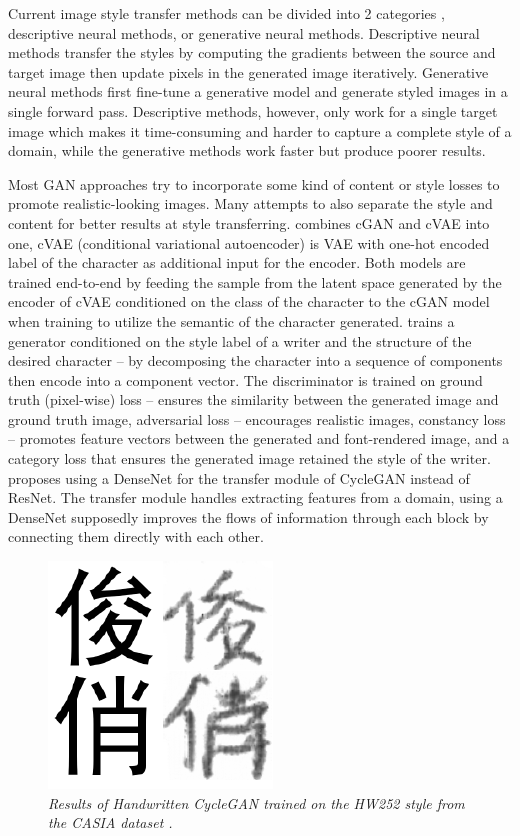 \documentclass[12pt]{report}
\begin{document}
Current image style transfer methods can be divided into 2 categories \cite{neural-style}, descriptive neural methods, or generative neural methods. Descriptive neural methods transfer the styles by computing the gradients between the source and target image then update pixels in the generated image iteratively. Generative neural methods first fine-tune a generative model and generate styled images in a single forward pass. Descriptive methods, however, only work for a single target image which makes it time-consuming and harder to capture a complete style of a domain, while the generative methods work faster but produce poorer results.

Most GAN\cite{gan} approaches try to incorporate some kind of content or style losses to promote realistic-looking images. Many attempts to also separate the style and content for better results at style transferring. \cite{handwritten-cgan} combines cGAN \cite{cgan} and cVAE \cite{cvae} into one, cVAE (conditional variational autoencoder) is VAE with one-hot encoded label of the character as additional input for the encoder. Both models are trained end-to-end by feeding the sample from the latent space generated by the encoder of cVAE conditioned on the class of the character to the cGAN model when training to utilize the semantic of the character generated.
\cite{calligan} trains a generator conditioned on the style label of a writer and the structure of the desired character – by decomposing the character into a sequence of components then encode into a component vector. The discriminator is trained on ground truth (pixel-wise) loss – ensures the similarity between the generated image and ground truth image, adversarial loss – encourages realistic images, constancy loss – promotes feature vectors between the generated and font-rendered image, and a category loss that ensures the generated image retained the style of the writer.
\cite{handwritten-cyclegan} proposes using a DenseNet for the transfer module of CycleGAN instead of ResNet. The transfer module handles extracting features from a domain, using a DenseNet supposedly improves the flows of information through each block by connecting them directly with each other.

\begin{figure}[h]
	\centering
	\includegraphics[scale=0.9]{handwritten-cycle-gan-result}
	\caption{\textit{Results of Handwritten CycleGAN \cite{handwritten-cyclegan} trained on the HW252 style from the CASIA dataset \cite{casia}.}}
	\label{fig:handwritten-cycle-gan-result}
\end{figure}
\end{document}
